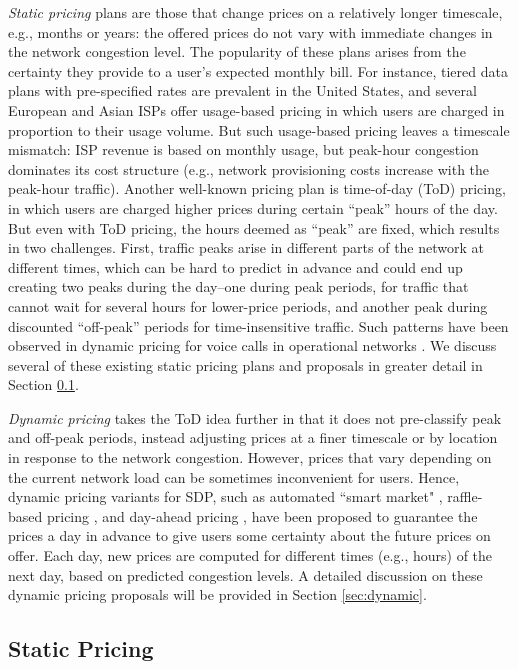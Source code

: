 \emph{Static pricing} plans are those that change prices on a relatively longer timescale, e.g., months or years: the offered prices do not vary with immediate changes in the network congestion level. The popularity of these plans arises from the certainty they provide to a user's expected monthly bill. For instance, tiered data plans with pre-specified rates are prevalent in the United States, and several European and Asian ISPs offer usage-based pricing in which users are charged in proportion to their usage volume. But such usage-based pricing leaves a timescale mismatch: ISP revenue is based on monthly usage, but peak-hour congestion dominates its cost structure (e.g., network provisioning costs increase with the peak-hour traffic). Another well-known pricing plan is time-of-day (ToD) pricing, in which users are charged higher prices during certain ``peak'' hours of the day. But even with ToD pricing, the hours deemed as ``peak'' are fixed, which results in two challenges. First, traffic peaks arise in different parts of the network at different times, which can be hard to predict in advance and could end up creating two peaks during the day--one during peak periods, for traffic that cannot wait for several hours for lower-price periods, and another peak during discounted ``off-peak'' periods for time-insensitive traffic. Such patterns have been observed in dynamic pricing for voice calls in operational networks \cite{Economist}. We discuss several of these existing static pricing plans and proposals in greater detail in Section \ref{sec:static}.

\emph{Dynamic pricing} takes the ToD idea further in that it does not pre-classify peak and off-peak periods, instead adjusting prices at a finer timescale or by location in response to the network congestion. However, prices that vary depending on the current network load can be sometimes inconvenient for users.  Hence, dynamic pricing variants for SDP, such as automated ``smart market" \cite{MacKie-Mason,Murphy-Murphy}, raffle-based pricing \cite{loiseau2011incentive}, and day-ahead pricing \cite{ha2012tube}, have been proposed to guarantee the prices a day in advance to give users some certainty about the future prices on offer. Each day, new prices are computed for different times (e.g., hours) of the next day, based on predicted congestion levels.  A detailed discussion on these dynamic pricing proposals will be provided in Section \ref{sec:dynamic}.


\subsection{Static Pricing}\label{sec:static}

